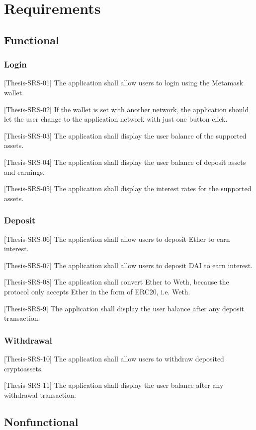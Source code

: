 \documentclass[11pt,a4paper]{report}
\begin{document}
\section{Requirements}
\subsection{Functional}
\subsubsection{Login}
[Thesis-SRS-01] The application shall allow users to login using the Metamask\cite{wiki:MetaMask} wallet.

[Thesis-SRS-02]  If the wallet is set with another network, the application should let the user change to the application network with just one button click.

[Thesis-SRS-03] The application shall display the user balance of the supported assets.

[Thesis-SRS-04] The application shall display the user balance of deposit assets and earnings.

[Thesis-SRS-05] The application shall display the interest rates for the supported assets.
\subsubsection{Deposit}
[Thesis-SRS-06] The application shall allow users to deposit Ether to earn interest.

[Thesis-SRS-07] The application shall allow users to deposit DAI to earn interest.

[Thesis-SRS-08] The application shall convert Ether to Weth, because the protocol only accepts Ether in the form of ERC20, i.e. Weth.

[Thesis-SRS-9] The application shall display the user balance after any deposit transaction.

\subsubsection{Withdrawal}
[Thesis-SRS-10] The application shall allow users to withdraw deposited cryptoassets.

[Thesis-SRS-11] The application shall display the user balance after any withdrawal transaction.

\subsection{Nonfunctional}
\end{document}
